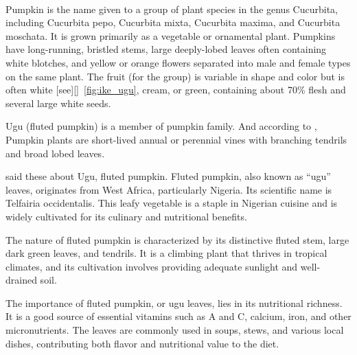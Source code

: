 \paragraph*{}Pumpkin is the name given to a group of plant species in the genus Cucurbita, including Cucurbita pepo, Cucurbita mixta, Cucurbita maxima, and Cucurbita moschata. It is grown primarily as a vegetable or ornamental plant.
%
Pumpkins have long-running, bristled stems, large deeply-lobed leaves often containing white blotches, and yellow or orange flowers separated into male and female types on the same plant. The fruit (for the group) is variable in shape and color but is often white [see][]~\ref{fig:ike_ugu}, cream, or green, containing about 70\% flesh and several large white seeds.
\newline

Ugu (fluted pumpkin) is a member of pumpkin family. And according to \citep{PumpkinDiseasesPests}, Pumpkin plants are short-lived annual or perennial vines with branching tendrils and broad lobed leaves. 


\citep{ifyInterestingFactsYou2024} said these about Ugu, fluted pumpkin.
Fluted pumpkin, also known as “ugu” leaves, originates from West Africa, particularly Nigeria. Its scientific name is Telfairia occidentalis. This leafy vegetable is a staple in Nigerian cuisine and is widely cultivated for its culinary and nutritional benefits.

The nature of fluted pumpkin is characterized by its distinctive fluted stem, large dark green leaves, and tendrils. It is a climbing plant that thrives in tropical climates, and its cultivation involves providing adequate sunlight and well-drained soil.

The importance of fluted pumpkin, or ugu leaves, lies in its nutritional richness. It is a good source of essential vitamins such as A and C, calcium, iron, and other micronutrients. The leaves are commonly used in soups, stews, and various local dishes, contributing both flavor and nutritional value to the diet.

